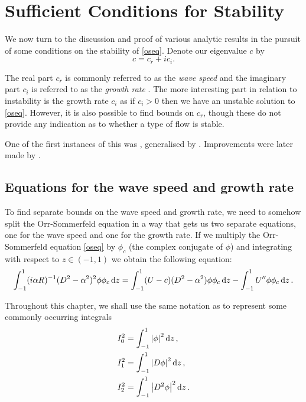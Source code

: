 \chapter{Sufficient Conditions for Stability}
\label{chap:suffcons}

We now turn to the discussion and proof of various analytic results in the pursuit of some conditions on the stability of \eqref{oseq}. Denote our eigenvalue $ c $ by
\begin{equation}
    c = c_r + i c_i.
\end{equation}

The real part $ c_r $ is commonly referred to as the \emph{wave speed} and the imaginary part $ c_i $ is referred to as the \emph{growth rate} \citep{drazin2004hydrodynamic}. The more interesting part in relation to instability is the growth rate $ c_i $ as if $ c_i > 0 $ then we have an unstable solution to \eqref{oseq}. However, it is also possible to find bounds on $ c_r $, though these do not provide any indication as to whether a type of flow is stable.

One of the first instances of this was \citet{synge1938hydrodynamical}, generalised by \citet{pai1954generalization}. Improvements were later made by \citet{joseph1968eigenvalue, joseph1969eigenvalue}.

\section{Equations for the wave speed and growth rate}

To find separate bounds on the wave speed and growth rate, we need to somehow split the Orr-Sommerfeld equation in a way that gets us two separate equations, one for the wave speed and one for the growth rate. If we multiply the Orr-Sommerfeld equation \eqref{oseq} by $ \phi_c $ (the complex conjugate of $ \phi $) and integrating with respect to $ z \in (-1, 1) $ we obtain the following equation:
\begin{gather}
    \int^{1}_{-1} (i \alpha R)^{-1} (D^2 - \alpha^2)^2 \phi \phi_c \dd{z}
    = \int^{1}_{-1} (U - c)(D^2 - \alpha^2) \phi \phi_c \dd{z} - \int^{1}_{-1} U'' \phi \phi_c \dd{z}.
\label{inteos}
\end{gather}

Throughout this chapter, we shall use the same notation as \citet{drazin2004hydrodynamic} to represent some commonly occurring integrals
\begin{align} 
        I^2_0 &= \int^{1}_{-1} \abs{\phi}^2 \dd{z},\\
        I^2_1 &= \int^{1}_{-1} \abs{D \phi}^2 \dd{z},\\
        I^2_2 &= \int^{1}_{-1} \abs{D^2 \phi}^2 \dd{z}. 
\end{align}

